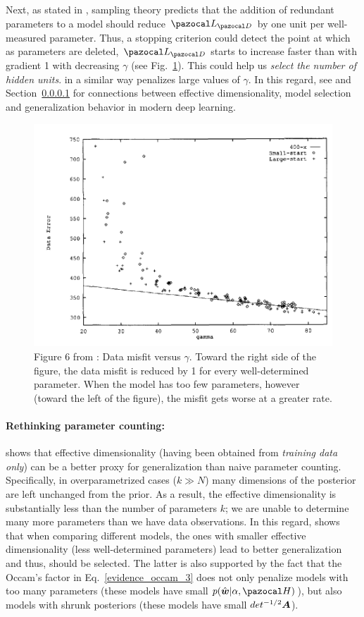Next, as stated in \textcite{mackay1992practical}, sampling theory predicts that the addition of redundant parameters to a model should reduce $\cL_{\cD}$ by one unit per well-measured parameter. 
Thus, a stopping criterion could detect the point at which as parameters are deleted, $\cL_{\cD}$ starts to increase faster than with gradient 1 with decreasing $\gamma$ (see Fig.~\ref{fig:gamma}).
This could help us \textit{select the number of hidden units}. 
\textcite{moody1991note} in a similar way penalizes large values of $\gamma$. 
In this regard, see \textcite{maddox2020rethinking} and Section~\ref{sec:rethinking} for connections between effective dimensionality, model selection and generalization behavior in modern deep learning.
\begin{figure}
	\centering
	\includegraphics[width=0.7\linewidth]{./Figures/gamma.png}
	\caption{Figure 6 from \textcite{mackay1992practical}: Data misfit versus $\gamma$.
	Toward the right side of the figure, the data misfit is reduced by 1 for every well-determined parameter. 
	When the model has too few parameters, however (toward the left of the figure), the misfit gets worse at a greater rate.}
	\label{fig:gamma}
\end{figure} 

\paragraph{Rethinking parameter counting:}\label{sec:rethinking} \textcite{maddox2020rethinking} shows that effective dimensionality (having been obtained from \textit{training data only}) can be a better proxy for generalization than naive parameter counting. 
Specifically, in overparametrized cases ($k \gg N$) many dimensions of the posterior are left unchanged from the prior. 
As a result, the effective dimensionality is substantially less than the number of parameters $k$; we are unable to determine many more parameters than we have data observations.
In this regard, \textcite{maddox2020rethinking} shows that when comparing different models, the ones with smaller effective dimensionality (less well-determined parameters) lead to better generalization and thus, should be selected.
The latter is also supported by the fact that the Occam's factor in Eq.~\eqref{evidence_occam_3} does not only penalize models with too many parameters (these models have small $p(\hat{\bw}|\alpha,\cH)$), but also models with shrunk posteriors (these models have small $det^{-1/2}\boldsymbol{A}$).

